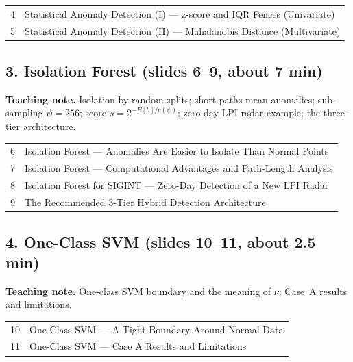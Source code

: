 \documentclass[11pt]{article}
\begin{document}
\begin{center}\small\renewcommand{\arraystretch}{1.1}\begin{tabularx}{\textwidth}{@{}r X@{}}4 & Statistical Anomaly Detection (I) --- z-score and IQR Fences (Univariate)\\
5 & Statistical Anomaly Detection (II) --- Mahalanobis Distance (Multivariate)\\\end{tabularx}\end{center}

\subsection{3. Isolation Forest \normalfont\small\color{GreyN}(slides 6--9, about 7 min)}

\textbf{Teaching note.} Isolation by random splits; short paths mean anomalies; sub-sampling $\psi=256$; score $s=2^{-E[h]/c(\psi)}$; zero-day LPI radar example; the three-tier architecture.

\begin{center}\small\renewcommand{\arraystretch}{1.1}\begin{tabularx}{\textwidth}{@{}r X@{}}6 & Isolation Forest --- Anomalies Are Easier to Isolate Than Normal Points\\
7 & Isolation Forest --- Computational Advantages and Path-Length Analysis\\
8 & Isolation Forest for SIGINT --- Zero-Day Detection of a New LPI Radar\\
9 & The Recommended 3-Tier Hybrid Detection Architecture\\\end{tabularx}\end{center}

\subsection{4. One-Class SVM \normalfont\small\color{GreyN}(slides 10--11, about 2.5 min)}

\textbf{Teaching note.} One-class SVM boundary and the meaning of $\nu$; Case~A results and limitations.

\begin{center}\small\renewcommand{\arraystretch}{1.1}\begin{tabularx}{\textwidth}{@{}r X@{}}10 & One-Class SVM --- A Tight Boundary Around Normal Data\\
11 & One-Class SVM --- Case A Results and Limitations\\\end{tabularx}\end{center}
\end{document}
